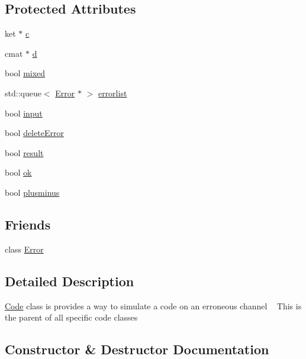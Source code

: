 \subsection*{Protected Attributes}
\begin{DoxyCompactItemize}
\item 
ket $\ast$ \hyperlink{class_code_a01a6ba9da79914bc6980ffddf53ecb24}{c}
\item 
cmat $\ast$ \hyperlink{class_code_a92025265fbd17156f2a3dc7a6e5364f6}{d}
\item 
bool \hyperlink{class_code_a299e61614fc7ae8e3cbcba232d57d042}{mixed}
\item 
std\+::queue$<$ \hyperlink{class_error}{Error} $\ast$ $>$ \hyperlink{class_code_a8eed999145874a4fe25c8a3ad589d225}{errorlist}
\item 
bool \hyperlink{class_code_a0bdc22fcdc5b2a78a8ace1aea2d96d34}{input}
\item 
bool \hyperlink{class_code_ae448fe74faf959e28ae7a17d13dd4790}{delete\+Error}
\item 
bool \hyperlink{class_code_ac65cd5a89311ea1059ba7d3772d812f9}{result}
\item 
bool \hyperlink{class_code_a62ce9f737b915662364116664261969a}{ok}
\item 
bool \hyperlink{class_code_abd650233920e3b6778032b7d58282976}{plusminus}
\end{DoxyCompactItemize}
\subsection*{Friends}
\begin{DoxyCompactItemize}
\item 
class \hyperlink{class_code_a16d3937baa3679c525821223427be40b}{Error}
\end{DoxyCompactItemize}


\subsection{Detailed Description}
\hyperlink{class_code}{Code} class is provides a way to simulate a code on an erroneous channel ~\newline
 This is the parent of all specific code classes 

\subsection{Constructor \& Destructor Documentation}
